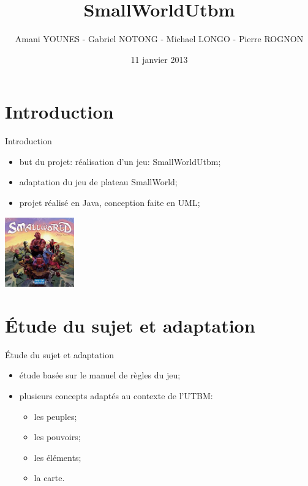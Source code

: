 \documentclass{beamer}
\title[SWU]{SmallWorldUtbm}
\author[]{Amani YOUNES - Gabriel NOTONG - Michael LONGO - Pierre ROGNON}
\institute{Programmation orientée objet - LO43}
\date{11 janvier 2013}
\begin{document}



\begin{frame}
\titlepage
\end{frame}

\section*{Introduction}

\begin{frame}{Introduction}
	
	\begin{itemize}
		\item but du projet: réalisation d'un jeu: SmallWorldUtbm;
		\vspace*{0.3cm}
		\item adaptation du jeu de plateau SmallWorld;
		\vspace*{0.3cm}
		\item projet réalisé en Java, conception faite en UML;
		\vspace*{0.3cm}
	\end{itemize}
	
	\begin{center}
		\includegraphics[width=3cm]{smallworld.jpg}
	\end{center}
\end{frame}

\section{Étude du sujet et adaptation}

\begin{frame}{Étude du sujet et adaptation}

	\begin{itemize}
		\item étude basée sur le manuel de règles du jeu;
		\vspace*{0.5cm}
		\item plusieurs concepts adaptés au contexte de l'UTBM:
		\begin{itemize}
			\item les peuples;
			\item les pouvoirs;
			\item les éléments;
			\item la carte.
		\end{itemize}
	\end{itemize}

\end{frame}
\end{document}
